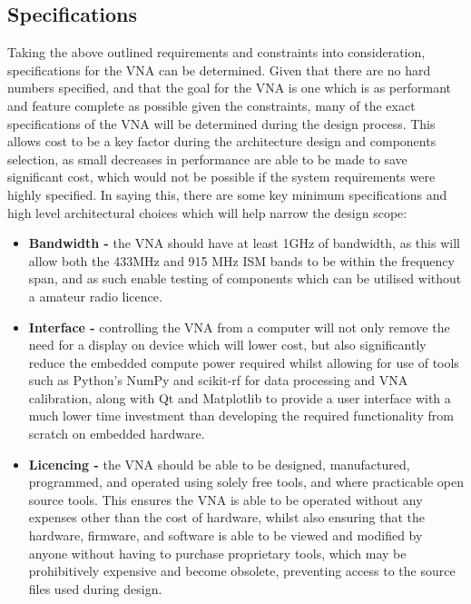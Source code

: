 \subsection{Specifications}
\label{subsec:specifications}
Taking the above outlined requirements and constraints into consideration, specifications for the VNA can be determined. Given that there are no hard numbers specified, and that the goal for the VNA is one which is as performant and feature complete as possible given the constraints, many of the exact specifications of the VNA will be determined during the design process. This allows cost to be a key factor during the architecture design and components selection, as small decreases in performance are able to be made to save significant cost, which would not be possible if the system requirements were highly specified. In saying this, there are some key minimum specifications and high level architectural choices which will help narrow the design scope:
\begin{itemize}
	\item \textbf{Bandwidth -} the VNA should have at least 1GHz of bandwidth, as this will allow both the 433MHz and 915 MHz ISM bands to be within the frequency span, and as such enable testing of components which can be utilised without a amateur radio licence. 
	\item \textbf{Interface -} controlling the VNA from a computer will not only remove the need for a display on device which will lower cost, but also significantly reduce the embedded compute power required whilst allowing for use of tools such as Python's NumPy and scikit-rf for data processing and VNA calibration, along with Qt and Matplotlib to provide a user interface with a much lower time investment than developing the required functionality from scratch on embedded hardware. 
	\item \textbf{Licencing -} the VNA should be able to be designed, manufactured, programmed, and operated using solely free tools, and where practicable open source tools. This ensures the VNA is able to be operated without any expenses other than the cost of hardware, whilst also ensuring that the hardware, firmware, and software is able to be viewed and modified by anyone without having to purchase proprietary tools, which may be prohibitively expensive and become obsolete, preventing access to the source files used during design. 
\end{itemize}